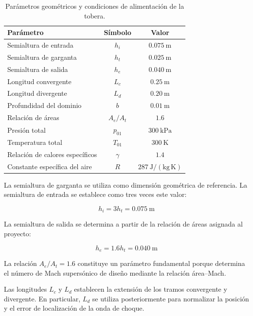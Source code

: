 \documentclass[12pt,letterpaper]{article}
\numberwithin{equation}{section}
\begin{document}
\begin{table}[H]
\centering
\caption{Parámetros geométricos y condiciones
de alimentación de la tobera.}
\label{tab:parametros_diseno}
\renewcommand{\arraystretch}{1.2}
\small
\begin{tabular}{lcc}
\toprule
\textbf{Parámetro} &
\textbf{Símbolo} &
\textbf{Valor} \\
\midrule
Semialtura de entrada &
$h_i$ & $0.075\ \mathrm{m}$ \\
Semialtura de garganta &
$h_t$ & $0.025\ \mathrm{m}$ \\
Semialtura de salida &
$h_e$ & $0.040\ \mathrm{m}$ \\
Longitud convergente &
$L_c$ & $0.25\ \mathrm{m}$ \\
Longitud divergente &
$L_d$ & $0.20\ \mathrm{m}$ \\
Profundidad del dominio &
$b$ & $0.01\ \mathrm{m}$ \\
Relación de áreas &
$A_e/A_t$ & $1.6$ \\
Presión total &
$p_{01}$ & $300\ \mathrm{kPa}$ \\
Temperatura total &
$T_{01}$ & $300\ \mathrm{K}$ \\
Relación de calores específicos &
$\gamma$ & $1.4$ \\
Constante específica del aire &
$R$ & $287\ \mathrm{J/(kg\,K)}$ \\
\bottomrule
\end{tabular}
\end{table}

La semialtura de garganta se utiliza como
dimensión geométrica de referencia.
La semialtura de entrada se establece
como tres veces este valor:

\begin{equation}
h_i=3h_t=0.075\ \mathrm{m}
\end{equation}

La semialtura de salida se determina
a partir de la relación de áreas
asignada al proyecto:

\begin{equation}
h_e=1.6h_t=0.040\ \mathrm{m}
\end{equation}

La relación $A_e/A_t=1.6$ constituye
un parámetro fundamental porque determina
el número de Mach supersónico de diseño
mediante la relación área--Mach.

Las longitudes $L_c$ y $L_d$ establecen
la extensión de los tramos convergente
y divergente. En particular, $L_d$
se utiliza posteriormente para normalizar
la posición y el error de localización
de la onda de choque.
\end{document}
